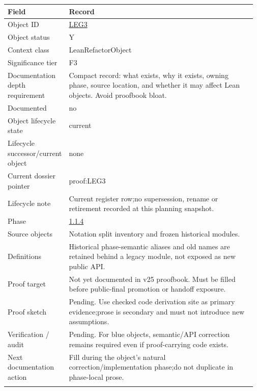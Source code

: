 \begin{longtable}{L{0.16\linewidth} L{0.81\linewidth}}
\hline
\textbf{Field} & \textbf{Record}\\
\hline
Object ID & \hyperlink{object-row-LEG3}{LEG3}\\
\hline\addlinespace[0.20em]
Object status & Y\\
\hline\addlinespace[0.20em]
Context class & LeanRefactorObject\\
\hline\addlinespace[0.20em]
Significance tier & F3\\
\hline\addlinespace[0.20em]
Documentation depth requirement & Compact record: what exists, why it exists, owning phase, source location, and whether it may affect Lean objects. Avoid proofbook bloat.\\
\hline\addlinespace[0.20em]
Documented & no\\
\hline\addlinespace[0.20em]
Object lifecycle state & current\\
\hline\addlinespace[0.20em]
Lifecycle successor/\allowbreak{}current object & none\\
\hline\addlinespace[0.20em]
Current dossier pointer & proof:LEG3\\
\hline\addlinespace[0.20em]
Lifecycle note & Current register row;\newline no supersession, rename or retirement recorded at this planning snapshot.\\
\hline\addlinespace[0.20em]
Phase & \hyperlink{phase-row-1-1-4}{1.1.4}\\
\hline\addlinespace[0.20em]
Source objects & Notation split inventory and frozen historical modules.\\
\hline\addlinespace[0.20em]
Definitions & Historical phase-semantic aliases and old names are retained behind a legacy module, not exposed as new public API.\\
\hline\addlinespace[0.20em]
Proof target & Not yet documented in v25 proofbook. Must be filled before public-final promotion or handoff exposure.\\
\hline\addlinespace[0.20em]
Proof sketch & Pending. Use checked code derivation site as primary evidence;\newline prose is secondary and must not introduce new assumptions.\\
\hline\addlinespace[0.20em]
Verification /\allowbreak{} audit & Pending. For blue objects, semantic/\allowbreak{}API correction remains required even if proof-carrying code exists.\\
\hline\addlinespace[0.20em]
Next documentation action & Fill during the object's natural correction/\allowbreak{}implementation phase;\newline do not duplicate in phase-local prose.\\
\hline\addlinespace[0.20em]
\end{longtable}
